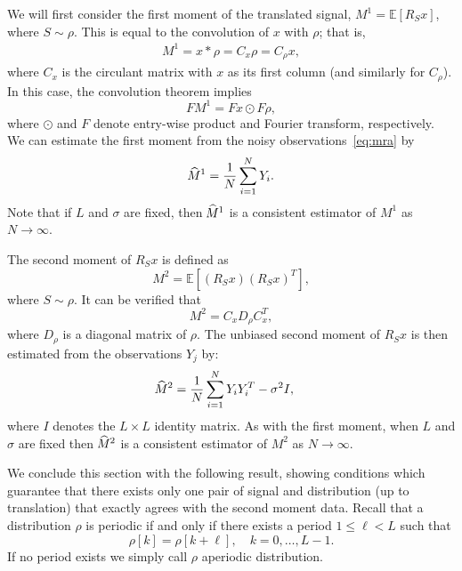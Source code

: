 \documentclass{IEEEtran}
\numberwithin{equation}{section}
\numberwithin{figure}{section}
\theoremstyle{plain}
\theoremstyle{definition}
\theoremstyle{remark}
\theoremstyle{plain}
\theoremstyle{remark}
\theoremstyle{plain}
\theoremstyle{plain}
\theoremstyle{remark}
\newcommand{\E}{\mathbb{E}}
\newcommand{\F}{F}
\newcommand{\hatM}{\widehat{\hspace{-1pt}M}\phantom{\hspace{-11pt}M}}
\begin{document}
We will first consider the first moment of the translated signal, $M^1= \E [R_S x]$, where $S \sim \rho$. This is equal to the convolution of $x$ with $\rho$; that is,
\begin{align} \label{eq:first_moment}
%
M^1 = x \ast \rho = C_x\rho = C_\rho x,
%
\end{align}
%
where $C_x$ is the circulant matrix with $x$ as its first column (and similarly for $C_\rho$). In this case, the convolution theorem implies
%
\begin{equation} \label{eqn:first_moment_fourier}
%
\F M^1 = \F{x}\odot\F{\rho},
%
\end{equation}
%
where $\odot$ and $\F$ denote entry-wise product and Fourier transform, respectively. We can estimate the first moment from the noisy observations~\eqref{eq:mra} by 
%
\begin{align} \label{eq:first_moment_est}
%
\hatM^1 = \frac{1}{N}\sum_{i=1}^N Y_i.
%
\end{align}
%
Note that if $L$ and $\sigma$ are fixed, then $\hatM^1$ is a consistent estimator of $M^1$ as $N \to \infty$.

The second moment of $R_S x$ is defined as 
\[ M^2 = \E \left[ (R_S x)(R_S x)^T \right] , \] 
where $S \sim \rho$. It can be verified that 
%
\begin{equation} \label{eq:SecondMomentExpectation}
%
M^2 = C_x D_\rho C_x^T,
%
\end{equation} 
%
where $D_\rho$ is a diagonal matrix of $\rho$. The unbiased second moment of $R_S x$ is then estimated from the observations $Y_j$ by:
%
\begin{align} \label{eq:second_moment_est}
%
\hatM^2 &= \frac{1}{N} \sum_{i=1}^N Y_i Y_i^T - \sigma^2 I,
%
\end{align}
%
where $I$ denotes the $L\times L$ identity matrix. As with the first moment, when $L$ and $\sigma$ are fixed then $\hatM^2$ is a consistent estimator of $M^2$ as $N \to \infty$.

We conclude this section with the following result, showing conditions which guarantee that there exists only one pair of signal and distribution (up to translation) that exactly agrees with the second moment data. Recall that a distribution $\rho$ is periodic if and only if there exists a period $1\le \ell<L$ such that
\begin{equation*}
\rho[k] = \rho[k+\ell] , \quad k=0,\ldots,L-1 . 
\end{equation*}
If no period exists we simply call $\rho$ aperiodic distribution.
\end{document}
